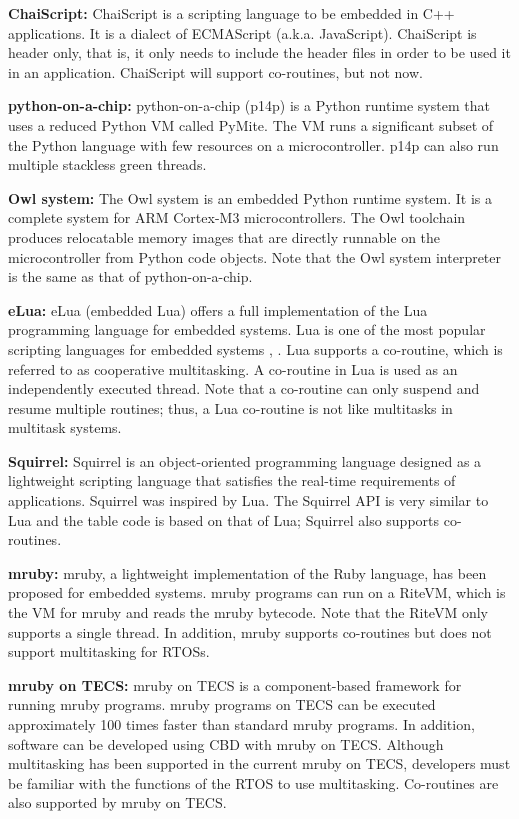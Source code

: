 \documentclass[S,R,E]{article/compsoft}
\begin{document}
{{\bf ChaiScript:} ChaiScript is a scripting language to be embedded in C++ applications.
It is a dialect of ECMAScript (a.k.a. JavaScript).
ChaiScript is header only, that is, it only needs to include the header files in order to be used it in an application.
ChaiScript will support co-routines, but not now. 

{\bf python-on-a-chip:} python-on-a-chip (p14p) is a Python runtime system that uses a reduced Python VM called PyMite.
The VM runs a significant subset of the Python language with few resources on a microcontroller.
p14p can also run multiple stackless green threads.

{\bf Owl system:} The Owl system is an embedded Python runtime system.
It is a complete system for ARM Cortex-M3 microcontrollers.
The Owl toolchain produces relocatable memory images that are directly runnable on the microcontroller from Python code objects.
Note that the Owl system interpreter is the same as that of python-on-a-chip.

{\bf eLua:} eLua (embedded Lua) offers a full implementation of the Lua programming language for embedded systems.
Lua is one of the most popular scripting languages for embedded systems \cite{url:Lua}, \cite{par:Lua}.
Lua supports a co-routine, which is referred to as cooperative multitasking.
A co-routine in Lua is used as an independently executed thread.
Note that a co-routine can only suspend and resume multiple routines; thus, a Lua co-routine is not like multitasks in multitask systems.

{\bf Squirrel:} Squirrel is an object-oriented programming language designed as a lightweight scripting language that satisfies the real-time requirements of applications.
Squirrel was inspired by Lua.
The Squirrel API is very similar to Lua and the table code is based on that of Lua; Squirrel also supports co-routines.

{\bf mruby:} mruby, a lightweight implementation of the Ruby language, has been proposed for embedded systems.
mruby programs can run on a RiteVM, which is the VM for mruby and reads the mruby bytecode.
Note that the RiteVM only supports a single thread.
In addition, mruby supports co-routines but does not support multitasking for RTOSs.

{\bf mruby on TECS:} mruby on TECS is a component-based framework for running mruby programs.
mruby programs on TECS can be executed approximately 100 times faster than standard mruby programs.
In addition, software can be developed using CBD with mruby on TECS.
Although multitasking has been supported in the current mruby on TECS, developers must be familiar with the functions of the RTOS to use multitasking.
Co-routines are also supported by mruby on TECS.

}
\end{document}
